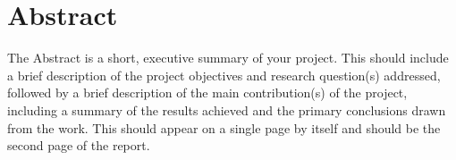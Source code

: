 \section*{Abstract}

The Abstract is a short, executive summary of your project. This should include a brief description of the project objectives and research question(s) addressed, followed by a brief description of the main contribution(s) of the project, including a summary of the results achieved and the primary conclusions drawn from the work. This should appear on a single page by itself and should be the second page of the report.